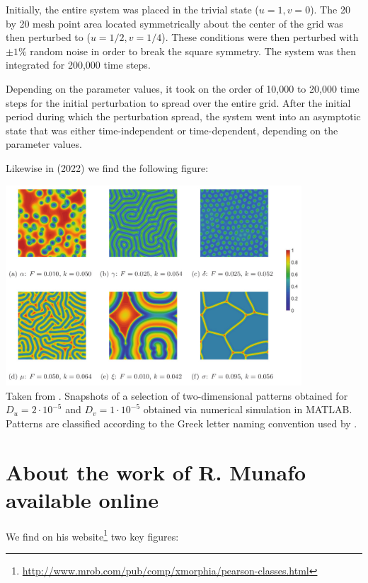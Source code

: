 Initially, the entire system was placed in the trivial state ($u=1,v=0$). The 20 by
20 mesh point area located symmetrically about the center of the grid was then
perturbed to ($u=1/2,v=1/4$). These conditions were then perturbed with $\pm 1\%$
random noise in order to break the square symmetry. The system was then integrated
for 200,000 time steps. 

Depending on the parameter values, it took on the order of 10,000 to
20,000 time steps for the initial perturbation to spread over the entire grid. 
After the initial period during which the perturbation spread, 
the system went into an asymptotic state that was either
time-independent or time-dependent, depending on the parameter values.

Likewise in \textcite{gane22} (2022) we find the following figure:
\begin{center}
\includegraphics[height=7.5cm]{python_codes/fieldstone_171/images/gane22}\\
{\captionfont Taken from \cite{gane22}. 
Snapshots of a selection of two-dimensional patterns obtained for
$D_u=2\cdot 10^{-5}$ and $D_v=1\cdot 10^{-5}$ obtained via numerical 
simulation in MATLAB. Patterns are classified according to the Greek letter 
naming convention used by \textcite{pear93}.
} 
\end{center}

\section*{About the work of R. Munafo available online}

We find on his website\footnote{\url{http://www.mrob.com/pub/comp/xmorphia/pearson-classes.html}}
two key figures:

